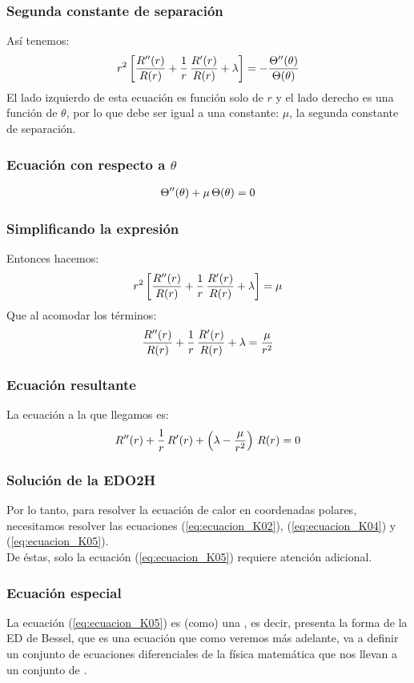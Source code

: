 \documentclass[12pt]{beamer}
\begin{document}
\begin{frame}
\frametitle{Segunda constante de separación}
Así tenemos:
\pause
\begin{align}
r^{2} \left[ \dfrac{{R}^{\prime \prime} (r)}{R (r)} + \dfrac{1}{r} \, \dfrac{{R}^{\prime} (r)}{R (r)} + \lambda \right] = - \dfrac{{\Theta}^{\prime \prime} (\theta)}{\Theta (\theta)}
\label{eq:ecuacion_K03}    
\end{align}
El lado izquierdo de esta ecuación es función solo de $r$ y el lado derecho es una función de $\theta$, por lo que debe ser igual a una constante: $\mu$, la segunda constante de separación.
\end{frame}
\begin{frame}
\frametitle{Ecuación con respecto a $\theta$}
\begin{align}
{\Theta}^{\prime \prime} (\theta) + \mu \, \Theta (\theta) = 0
\label{eq:ecuacion_K04}    
\end{align}
\end{frame}
\begin{frame}
\frametitle{Simplificando la expresión}
Entonces hacemos:
\pause
\begin{align*}
r^{2} \left[ \dfrac{{R}^{\prime \prime} (r)}{R (r)} + \dfrac{1}{r} \, \dfrac{{R}^{\prime} (r)}{R (r)} + \lambda \right] = \mu
\end{align*}
\pause
Que al acomodar los términos:
\pause
\begin{align*}
\dfrac{{R}^{\prime \prime} (r)}{R (r)} + \dfrac{1}{r} \, \dfrac{{R}^{\prime} (r)}{R (r)} + \lambda = \dfrac{\mu}{r^{2}}
\end{align*}
\end{frame}
\begin{frame}
\frametitle{Ecuación resultante}
La ecuación a la que llegamos es:
\pause
\begin{align}
{R}^{\prime \prime} (r) + \dfrac{1}{r} \, {R}^{\prime} (r) + \left( \lambda - \dfrac{\mu}{r^{2}} \right) \, R (r) = 0
\label{eq:ecuacion_K05}    
\end{align}
\end{frame}
\begin{frame}
\frametitle{Solución de la EDO2H}
Por lo tanto, para resolver la ecuación de calor en coordenadas polares, necesitamos resolver las ecuaciones (\ref{eq:ecuacion_K02}), (\ref{eq:ecuacion_K04}) y (\ref{eq:ecuacion_K05}).
\\
\bigskip
\pause
De éstas, solo la ecuación (\ref{eq:ecuacion_K05}) requiere atención adicional.
\end{frame}
\begin{frame}
\frametitle{Ecuación especial}
La ecuación (\ref{eq:ecuacion_K05}) es (como) una , es decir, presenta la forma de la ED de Bessel, que es una ecuación que como veremos más adelante, \pause va a definir un conjunto de ecuaciones diferenciales de la física matemática que nos llevan a un conjunto de .
\end{frame}
\end{document}
